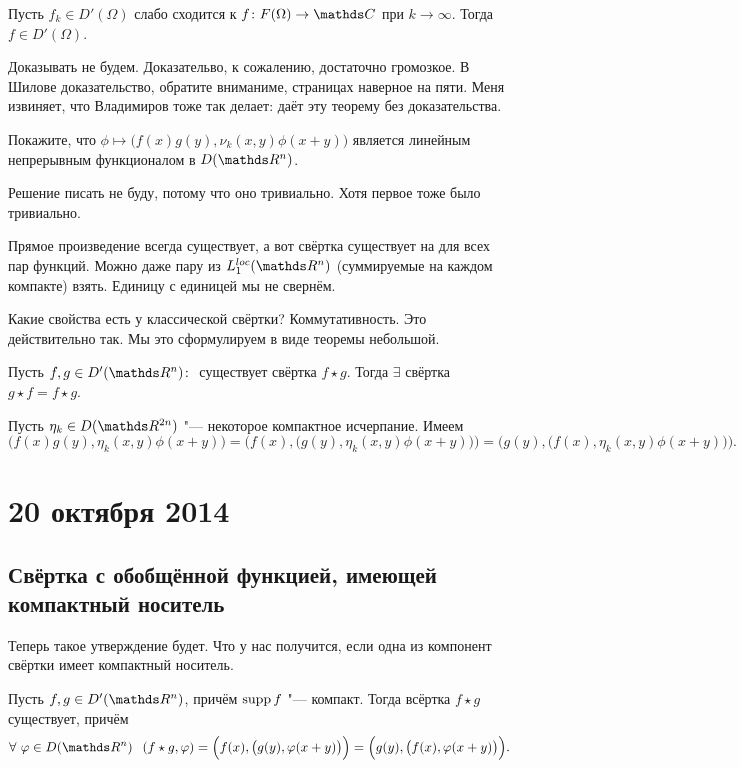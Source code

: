 \begin{The}
  Пусть $f_k\in D'(\Omega)$ слабо сходится к $f\colon F(\Omega)\to \C$ при $k\to\infty$. Тогда $f\in D'(\Omega)$.
\end{The}
Доказывать не будем. Доказательво, к сожалению, достаточно громозкое. В Шилове доказательство, обратите вниманиме, страницах наверное на пяти. Меня извиняет, что Владимиров тоже так делает: даёт эту теорему без доказательства.
\begin{Task}
  Покажите, что $\phi\mapsto \big(f(x)g(y), \nu_k(x,y)\phi(x+y)\big)$ является линейным непрерывным функционалом в $D(\R^n)$.
\end{Task}
Решение писать не буду, потому что оно тривиально. Хотя первое тоже было тривиально.

Прямое произведение всегда существует, а вот свёртка существует на для всех пар функций. Можно даже пару из $L_1^{loc}(\R^n)$ (суммируемые на каждом компакте) взять. Единицу с единицей мы не свернём.

Какие свойства есть у классической свёртки? Коммутативность. Это действительно так. Мы это сформулируем в виде теоремы небольшой.
\begin{The}
  Пусть $f,g\in D'(\R^n)\colon$ существует свёртка $f\star g$. Тогда $\exists$ свёртка $g\star f = f\star g$.
\end{The}

\begin{Proof}
  Пусть $\eta_k\in D(\R^{2n})$ "--- некоторое компактное исчерпание. Имеем
  \[ \big(f(x)g(y),\eta_k(x,y)\phi(x+y)\big) = \Big(f(x),\big(g(y),\eta_k(x,y)\phi(x+y)\big)\Big) = \Big(g(y),\big(f(x),\eta_k(x,y)\phi(x+y)\big)\Big).\]
\end{Proof}

\section{20 октября 2014}
\subsection{Свёртка с обобщённой функцией, имеющей компактный носитель}
Теперь такое утверждение будет. Что у нас получится, если одна из компонент свёртки имеет компактный носитель.
\begin{The}
  Пусть $f,g\in D'(\R^n)$, причём $\operatorname{supp} f$ "--- компакт. Тогда всёртка $f\star g$ существует, причём
  \begin{equation}\label{jora1} \forall\ \phi\in D(\R^n)\pau(f\star g,\phi) = \Big(f(x),\big(g(y),\phi(x+y)\big)\Big) = \Big(g(y),\big(f(x),\phi(x+y)\big)\Big).\end{equation}
\end{The}

